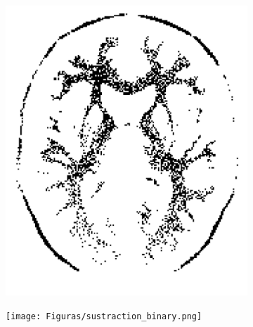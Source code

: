 \documentclass[11pt,twocolumn,twoside]{opticajnl}
\begin{document}
\begin{figure}[h]
\begin{subfigure}[h]{0.24\linewidth}
            \includegraphics[width=\textwidth]{Figuras/ImageA_binary.png}
         \end{subfigure}
         \begin{subfigure}[h]{0.24\linewidth}
            \centering
            \texttt{[image: Figuras/sustraction\_binary.png]}
         \end{subfigure}
                 \caption{Difererencia entre la imagen original y la imagen binarizada.} 
                 \label{fig:binary_sustraction}
        \begin{subfigure}[h]{0.24\linewidth}
            \centering

\end{subfigure}
\end{figure}
\end{document}
